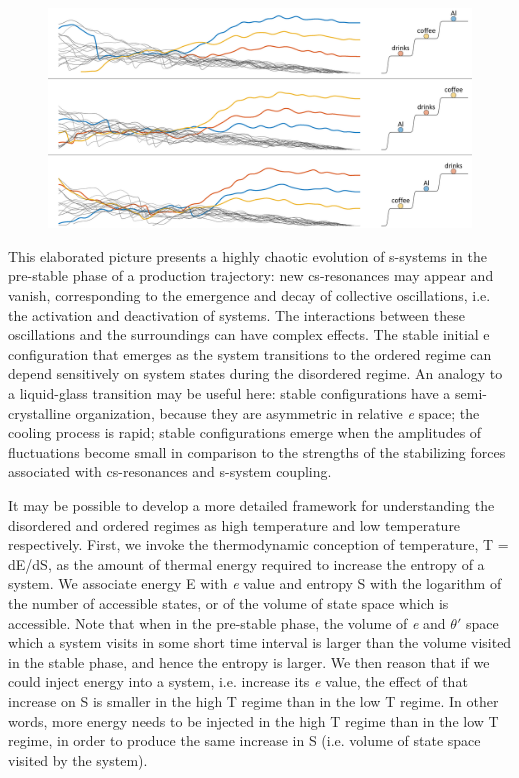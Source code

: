    
\begin{figure}
\includegraphics[width=\textwidth]{figures/Tilsen-img77.png}
\caption{\missingcaption}
\label{fig:}
\end{figure}
 

  This elaborated picture presents a highly chaotic evolution of s-systems in the pre-stable phase of a production trajectory: new cs-resonances may appear and vanish, corresponding to the emergence and decay of collective oscillations, i.e. the activation and deactivation of systems. The interactions between these oscillations and the surroundings can have complex effects. The stable initial e configuration that emerges as the system transitions to the ordered regime can depend sensitively on system states during the disordered regime. An analogy to a liquid-glass transition may be useful here: stable configurations have a semi-crystalline organization, because they are asymmetric in relative \textit{e} space; the cooling process is rapid; stable configurations emerge when the amplitudes of fluctuations become small in comparison to the strengths of the stabilizing forces associated with cs-resonances and s-system coupling.

  It may be possible to develop a more detailed framework for understanding the disordered and ordered regimes as high temperature and low temperature respectively. First, we invoke the thermodynamic conception of temperature, T = dE/dS, as the amount of thermal energy required to increase the entropy of a system. We associate energy E with \textit{e} value and entropy S with the logarithm of the number of accessible states, or of the volume of state space which is accessible. Note that when in the pre-stable phase, the volume of \textit{e} and $\theta ′$ space which a system visits in some short time interval is larger than the volume visited in the stable phase, and hence the entropy is larger. We then reason that if we could inject energy into a system, i.e. increase its \textit{e} value, the effect of that increase on S is smaller in the high T regime than in the low T regime. In other words, more energy needs to be injected in the high T regime than in the low T regime, in order to produce the same increase in S (i.e. volume of state space visited by the system).

